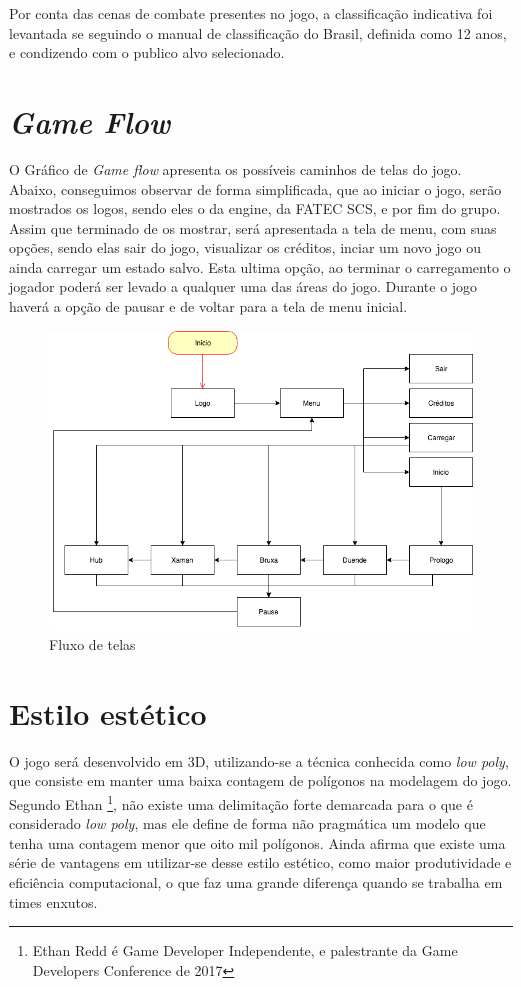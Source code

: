 Por conta das cenas de combate presentes no jogo, a classificação indicativa foi levantada se seguindo o manual de classificação do Brasil\cite{classificacao}, definida como 12 anos, e condizendo com o publico alvo selecionado.

\section{\textit{Game Flow}}

O Gráfico de \textit{Game flow} apresenta os possíveis caminhos de telas do jogo. Abaixo, conseguimos observar de forma simplificada, que ao iniciar o jogo, serão mostrados os logos, sendo eles o da engine, da FATEC SCS, e por fim do grupo. Assim que terminado de os mostrar, será apresentada a tela de menu, com suas opções, sendo elas sair do jogo, visualizar os créditos, inciar um novo jogo ou ainda carregar um estado salvo. Esta ultima opção, ao terminar o carregamento o jogador poderá ser levado a qualquer uma das áreas do jogo.
Durante o jogo haverá a opção de pausar e de voltar para a tela de menu inicial.


\begin{figure}[!htb]
    \caption{\label{fig_grafico}Fluxo de telas} \begin{center}
    \includegraphics[width=\textwidth]{imagens/Flow.png} \end{center}
 \end{figure}

\section{Estilo estético}
O jogo será desenvolvido em 3D, utilizando-se a técnica conhecida como \textit{low poly}, que consiste em manter uma baixa contagem de polígonos na modelagem do jogo. Segundo Ethan  \footnote{Ethan Redd é Game Developer Independente, e palestrante da Game Developers Conference de 2017}, não existe uma delimitação forte demarcada para o que é considerado \textit{low poly}, mas ele define de forma não pragmática um modelo que tenha uma contagem menor que oito mil polígonos. Ainda afirma que existe uma série de vantagens em utilizar-se desse estilo estético, como maior produtividade e eficiência computacional, o que faz uma grande diferença quando se trabalha em times enxutos.

